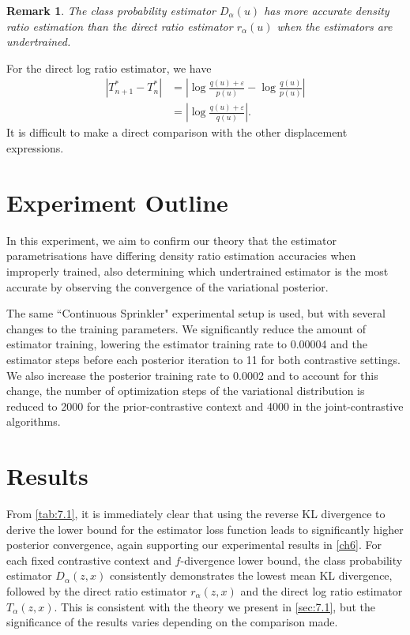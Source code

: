 \documentclass[honours,12pt]{unswthesis}
\newtheorem{remark}[theorem]{Remark}
\numberwithin{equation}{section}
\theoremstyle{definition}
\begin{document}
\begin{remark}
The class probability estimator $D_\alpha(u)$ has more accurate density ratio estimation than the direct ratio estimator $r_\alpha(u)$ when the estimators are undertrained.
\end{remark}
For the direct log ratio estimator, we have
\begin{align*}
|T^*_{n+1}-T^*_{n}|&=\left|\log \frac{q(u)+\varepsilon}{p(u)}-\log \frac{q(u)}{p(u)}\right|\\
&=\left|\log \frac{q(u)+\varepsilon}{q(u)}\right|.
\end{align*}
It is difficult to make a direct comparison with the other displacement expressions.

\section{Experiment Outline}
In this experiment, we aim to confirm our theory that the estimator parametrisations have differing density ratio estimation accuracies when improperly trained, also determining which undertrained estimator is the most accurate by observing the convergence of the variational posterior.

The same ``Continuous Sprinkler" experimental setup is used, but with several changes to the training parameters. We significantly reduce the amount of estimator training, lowering the estimator training rate to 0.00004 and the estimator steps before each posterior iteration to 11 for both contrastive settings. We also increase the posterior training rate to 0.0002 and to account for this change, the number of optimization steps of the variational distribution is reduced to 2000 for the prior-contrastive context and 4000 in the joint-contrastive algorithms. 
\section{Results}
From \autoref{tab:7.1}, it is immediately clear that using the reverse KL divergence to derive the lower bound for the estimator loss function leads to significantly higher posterior convergence, again supporting our experimental results in \autoref{ch6}. For each fixed contrastive context and $f$-divergence lower bound, the class probability estimator $D_\alpha(z,x)$ consistently demonstrates the lowest mean KL divergence, followed by the direct ratio estimator $r_\alpha (z,x)$ and the direct log ratio estimator $T_\alpha(z,x)$. This is consistent with the theory we present in \autoref{sec:7.1}, but the significance of the results varies depending on the comparison made.
\end{document}
